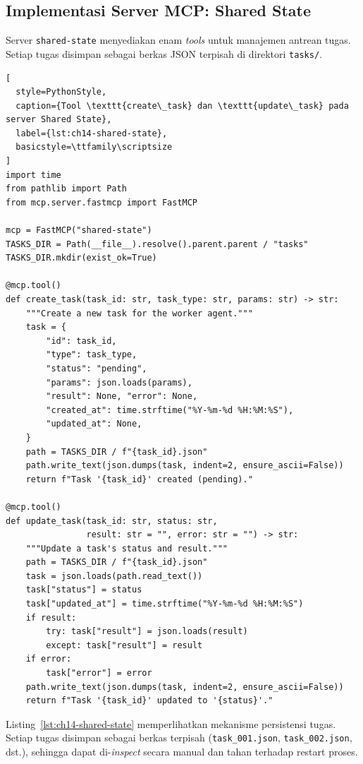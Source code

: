 \subsection{Implementasi Server MCP: Shared State}

Server \texttt{shared-state} menyediakan enam \textit{tools} untuk manajemen antrean tugas. Setiap tugas disimpan sebagai berkas JSON terpisah di direktori \texttt{tasks/}.

\begin{lstlisting}[
  style=PythonStyle,
  caption={Tool \texttt{create\_task} dan \texttt{update\_task} pada server Shared State},
  label={lst:ch14-shared-state},
  basicstyle=\ttfamily\scriptsize
]
import time
from pathlib import Path
from mcp.server.fastmcp import FastMCP

mcp = FastMCP("shared-state")
TASKS_DIR = Path(__file__).resolve().parent.parent / "tasks"
TASKS_DIR.mkdir(exist_ok=True)

@mcp.tool()
def create_task(task_id: str, task_type: str, params: str) -> str:
    """Create a new task for the worker agent."""
    task = {
        "id": task_id,
        "type": task_type,
        "status": "pending",
        "params": json.loads(params),
        "result": None, "error": None,
        "created_at": time.strftime("%Y-%m-%d %H:%M:%S"),
        "updated_at": None,
    }
    path = TASKS_DIR / f"{task_id}.json"
    path.write_text(json.dumps(task, indent=2, ensure_ascii=False))
    return f"Task '{task_id}' created (pending)."

@mcp.tool()
def update_task(task_id: str, status: str,
                result: str = "", error: str = "") -> str:
    """Update a task's status and result."""
    path = TASKS_DIR / f"{task_id}.json"
    task = json.loads(path.read_text())
    task["status"] = status
    task["updated_at"] = time.strftime("%Y-%m-%d %H:%M:%S")
    if result:
        try: task["result"] = json.loads(result)
        except: task["result"] = result
    if error:
        task["error"] = error
    path.write_text(json.dumps(task, indent=2, ensure_ascii=False))
    return f"Task '{task_id}' updated to '{status}'."
\end{lstlisting}

\noindent Listing~\ref{lst:ch14-shared-state} memperlihatkan mekanisme persistensi tugas. Setiap tugas disimpan sebagai berkas terpisah (\texttt{task\_001.json}, \texttt{task\_002.json}, dst.), sehingga dapat di-\textit{inspect} secara manual dan tahan terhadap restart proses.


